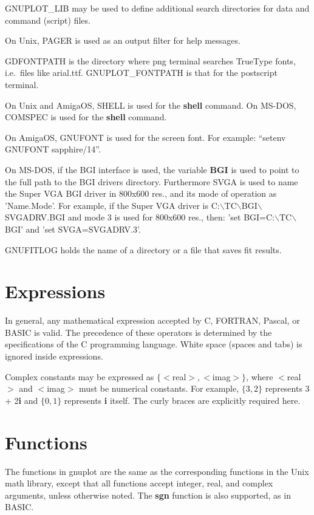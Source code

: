 GNUPLOT\_LIB may be used to define additional search directories for
data and command (script) files.

On Unix, PAGER is used as an output filter for help messages.

GDFONTPATH is the directory where png terminal searches TrueType fonts, 
i.e.~files like arial.ttf.
GNUPLOT\_FONTPATH is that for the postscript terminal.

On Unix and AmigaOS, SHELL is used for the {\bf shell} command. On MS-DOS,
COMSPEC is used for the {\bf shell} command.

On AmigaOS, GNUFONT is used for the screen font.  For example:
``setenv GNUFONT sapphire/14''.

On MS-DOS, if the BGI interface is used, the variable {\bf BGI} is used to point
to the full path to the BGI drivers directory. Furthermore SVGA is used to
name the Super VGA BGI driver in 800x600 res., and its mode of operation
as 'Name.Mode'.
For example, if the Super VGA driver is 
C:$\backslash$TC$\backslash$BGI$\backslash$SVGADRV.BGI
and mode 3 is used for 800x600 res., then: 
'set BGI=C:$\backslash$TC$\backslash$BGI' and 'set SVGA=SVGADRV.3'.

GNUFITLOG holds the name of a directory or a file that saves fit results.


\section{Expressions}
In general, any mathematical expression accepted by C, FORTRAN,
Pascal, or BASIC is valid. The precedence of these operators is
determined by the specifications of the C programming language.
White space (spaces and tabs) is ignored inside expressions.

Complex constants may be expressed as $\{<$real$>,<$imag$>\}$, where
$<$real$>$ and $<$imag$>$ must be numerical constants.  For example,
$\{3,2\}$ represents 3 + 2{\bf i} and $\{0,1\}$ represents {\bf i}
itself.  The curly braces are explicitly required here.
\section{Functions}
The functions in gnuplot are the same as the corresponding functions
in the Unix math library, except that all functions accept integer,
real, and complex arguments, unless otherwise noted. The {\bf sgn}
function is also supported, as in BASIC.

